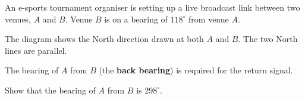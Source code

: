 \begin{question}
\noindent An e-sports tournament organiser is setting up a live broadcast link between two venues, $A$ and $B$. Venue $B$ is on a bearing of $118^\circ$ from venue $A$.

The diagram shows the North direction drawn at both $A$ and $B$. The two North lines are parallel.

\begin{center}
\end{center}

\noindent The bearing of $A$ from $B$ (the \textbf{back bearing}) is required for the return signal.

\noindent Show that the bearing of $A$ from $B$ is $298^\circ$.

\vspace{4cm}

\end{question}